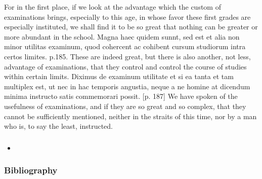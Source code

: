 For in the first place, if we look at the advantage which the custom of examinations brings, especially to this age, in whose favor these first grades are especially instituted, we shall find it to be so great that nothing can be greater or more abundant in the school.
Magna haec quidem sunnt, sed est et alia non minor utilitas examinum, quod cohercent ac cohibent cursum studiorum intra certos limites. p.185.
These are indeed great, but there is also another, not less, advantage of examinations, that they control and control the course of studies within certain limits.
Diximus de examinum utilitate et si ea tanta et tam multiplex est, ut nec in hac temporis angustia, neque a ne homine at dicendum minima instructo satis commemorari possit. [p. 187]
We have spoken of the usefulness of examinations, and if they are so great and so complex, that they cannot be sufficiently mentioned, neither in the straits of this time, nor by a man who is, to say the least, instructed.
\fi
\begin{frame}[fragile]
\frametitle{}
\pause
\begin{itemize}[<+->]
\item
\end{itemize}
\end{frame}
\begin{frame}[fragile]
\frametitle{}
\pause
\end{frame}

\begin{frame}[allowframebreaks]
\frametitle{Bibliography}

\end{frame}

